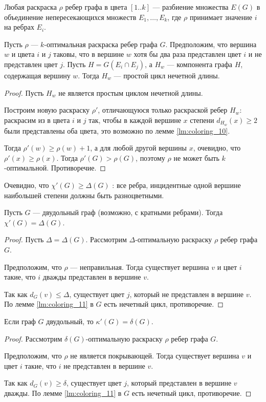 Любая раскраска $\rho$ ребер графа в цвета $[1 .. k]$ --- разбиение множества $E(G)$ в объединение непересекающихся множеств $E_1, \ldots , E_k$, где $\rho$ принимает значение $i$ на ребрах $E_i$.
\begin{lemma}\label{lm:coloring_11}
    Пусть $\rho$ --- $k$-оптимальная раскраска ребер графа $G$. Предположим, что вершина  $w$ и цвета $i$ и $j$ таковы, что в вершине $w$ хотя бы два раза представлен цвет $i$ и не представлен цвет  $j$. Пусть $H = G(E_{i} \cap E_j)$, а $H_w$ --- компонента графа $H$, содержащая  вершину $w$. Тогда $H_w$ --- простой цикл нечетной длины.
\end{lemma}
\begin{proof}
    Пусть $H_w$ не является простым циклом нечетной длины.

	Построим новую раскраску $\rho'$, отличающуюся только раскраской ребер $H_w$: раскрасим из в цвета $i$ и $j$ так, чтобы в каждой вершине $x$ степени $d_{H_w}(x) \ge 2$ были представлены оба цвета, это возможно по лемме \ref{lm:coloring_10}.

	Тогда $\rho'(w) \ge \rho(w) + 1$, а для любой другой вершины $x$, очевидно, что $\rho'(x) \ge \rho(x)$. Тогда $\rho'(G) > \rho(G)$, поэтому $\rho$ не может быть $k$-оптимальной. Противоречие. 
\end{proof}
\begin{note}
    Очевидно, что $\chi'(G) \ge \Delta(G)$ : все ребра, инцидентные одной вершине наибольшей степени должны быть разноцветными.
\end{note}
\begin{theorem}[Кениг, 1916]
    Пусть $G$ --- двудольный граф (возможно, с кратными ребрами). Тогда $\chi'(G) = \Delta(G)$.
\end{theorem}
\begin{proof}
    Пусть $\Delta = \Delta(G)$. Рассмотрим $\Delta$-оптимальную раскраску $\rho$ ребер графа $G$.

	Предположим, что $\rho$ --- неправильная. Тогда существует вершина $v$ и цвет $i$ такие, что $i$ дважды представлен в вершине $v$. 

	Так как $d_G(v) \le \Delta$, существует цвет $j$, который не представлен в вершине $v$. По лемме \ref{lm:coloring_11} в $G$ есть нечетный цикл, противоречие.
\end{proof}

\begin{theorem}[Гупта, 1966]
    Если граф $G$ двудольный, то $\kappa'(G) = \delta(G)$.
\end{theorem}
\begin{proof}
    Рассмотрим $\delta(G)$-оптимальную раскраску $\rho$ ребер графа $G$.

	Предположим, что $\rho$ не является покрывающей. Тогда существует вершина $v$ и цвет $i$ такие, что $i$ не представлен в вершине $v$. 

	Так как $d_G(v) \ge  \delta$, существует цвет $j$, который представлен в вершине $v$ дважды. По лемме \ref{lm:coloring_11} в $G$ есть нечетный цикл, противоречие.
\end{proof}
